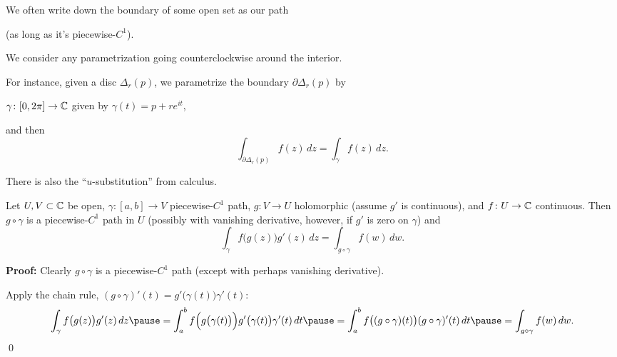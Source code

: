 \documentclass[10pt,aspectratio=169]{beamer}
\begin{document}
\begin{frame}
We often write down the
boundary of some open set as our path

(as long as it's piecewise-$C^1$).

\medskip
\pause

We consider any parametrization going counterclockwise around the interior.

\medskip
\pause

For instance, given a disc $\Delta_r(p)$, we parametrize
the boundary $\partial \Delta_r(p)$ by

$\gamma  \colon [0,2\pi] \to {\mathbb{C}}$ given by $\gamma(t) = p + re^{it}$,

\medskip
\pause

and then 
\begin{equation*}
\int_{\partial \Delta_r(p)} f(z) \, dz
=
\int_{\gamma} f(z) \, dz .
\end{equation*}
\end{frame}

\begin{frame}
There is also the ``$u$-substitution'' from calculus.
\pause

\begin{proposition}
Let $U,V \subset {\mathbb{C}}$ be open, $\gamma \colon [a,b] \to V$ 
piecewise-$C^1$ path, $g \colon V \to U$ holomorphic
(assume $g'$ is continuous), and $f \colon U \to {\mathbb{C}}$
continuous.
\pause
Then $g \circ \gamma$ is a piecewise-$C^1$ path in $U$
(possibly with vanishing derivative, however, if $g'$ is zero on $\gamma$) and
\pause
\begin{equation*}
\int_{\gamma} f\bigl(g(z)\bigr) g'(z) \, dz
=
\int_{g \circ \gamma} f(w) \, dw .
\end{equation*}
\end{proposition}

\pause
\textbf{Proof:}
Clearly $g \circ \gamma$ is a piecewise-$C^1$ path (except with perhaps
vanishing derivative).

\medskip
\pause
Apply the chain rule,
$(g \circ \gamma)'(t) = g'\bigl(\gamma(t)\bigr) \gamma'(t)$:
\pause
\[
\int_{\gamma} f\bigl(g(z)\bigr) g'(z) \, dz
\pause
=
\int_a^b
f\Bigl(g\bigl(\gamma(t)\bigr)\Bigr) g'\bigl(\gamma(t)\bigr) \gamma'(t) \, dt
\pause
=
\int_a^b
f\bigl((g \circ \gamma)(t)\bigr) (g \circ \gamma)'(t) \, dt
\pause
=
\int_{g \circ \gamma} f(w) \, dw .
\]
\qed
\end{frame}
\end{document}
